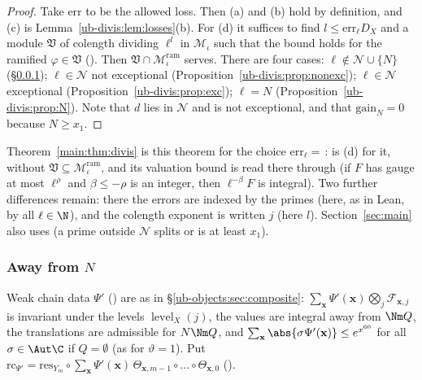 \begin{proof}
Take $\mathrm{err}$ to be the allowed loss. Then (a) and (b) hold by definition, and (c) is
Lemma~\ref{ub-divis:lem:losses}(b). For (d) it suffices to find $l\le\mathrm{err}_\ell D_X$ and a module
$\mathfrak V$ of colength dividing $\ell^l$ in $\mathcal M_\iota$ such that the bound holds for the ramified
$\varphi\in\mathfrak V$ (). Then $\mathfrak V\cap\mathcal
M^{\mathrm{ram}}_\iota$ serves. There are four cases: $\ell\notin\mathcal N\cup\{N\}$
(\S\ref{ub-divis:sec:away}); $\ell\in\mathcal N$ not exceptional
(Proposition~\ref{ub-divis:prop:nonexc}); $\ell\in\mathcal N$ exceptional
(Proposition~\ref{ub-divis:prop:exc});
$\ell=N$ (Proposition~\ref{ub-divis:prop:N}). Note that $d$ lies in $\mathcal N$ and is
not exceptional, and that $\mathrm{gain}_N=0$ because $N\ge x_1$.
\end{proof}

Theorem~\ref{main:thm:divis} is this theorem for the choice $\mathrm{err}_\ell=$\,:
 is (d) for it, without
$\mathfrak V\subseteq\mathcal M^{\mathrm{ram}}_\iota$, and its valuation bound is read there through
 (if $F$ has gauge at most $\ell^\rho$ and $\beta\le-\rho$ is an
integer, then $\ell^{-\beta}F$ is integral). Two further differences remain: there the errors
are indexed by the primes (here, as in Lean, by all $\ell\in\N$), and the colength exponent is
written $j$ (here $l$). Section~\ref{sec:main} also uses
 (a prime outside $\mathcal N$
splits or is at least $x_1$).

\subsubsection{Away from $N$}\label{ub-divis:sec:away}
Weak chain data $\Psi'$ () are as in \S\ref{ub-objects:sec:composite}:
$\sum_{\mathbf x}\Psi'(\mathbf x)\bigotimes_j\mathcal F_{\mathbf x,j}$ is invariant under the levels
$\operatorname{level}_X(j)$, the values are integral away from $\Nm Q$, the translations are
admissible for $N\Nm Q$, and $\sum_{\mathbf x}\abs{\sigma\Psi'(\mathbf x)}\le e^{x^{60}}$ for all
$\sigma\in\Aut\C$ if $Q=\emptyset$ (as for $\vartheta=1$). Put
$\mathrm{rc}_{\Psi'}=\mathrm{res}_{Y_m}\circ\sum_{\mathbf x}\Psi'(\mathbf x)\,\Theta_{\mathbf x,m-1}\circ\dots\circ\Theta_{\mathbf x,0}$
().

